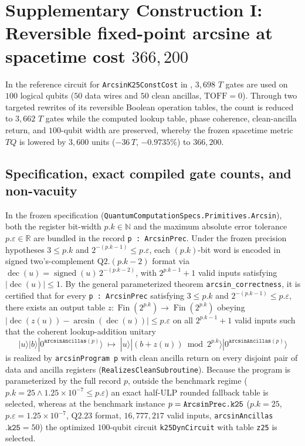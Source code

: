 \documentclass[11pt,a4paper]{article}
\theoremstyle{definition}
\theoremstyle{remark}
\begin{document}
\section{Supplementary Construction I: Reversible fixed-point arcsine at spacetime cost \texorpdfstring{\(366{,}200\)}{366,200}}
\label{sec:arcsin}

In the reference circuit for \texttt{ArcsinK25\allowbreak ConstCost} in \cite{shirobokov2026}, \(3{,}698\) \(T\) gates are used on \(100\) logical qubits (\(50\) data wires and \(50\) clean ancillas, \(\mathrm{TOFF} = 0\)). Through two targeted rewrites of its reversible Boolean operation tables, the count is reduced to \(3{,}662\) \(T\) gates while the computed lookup table, phase coherence, clean-ancilla return, and \(100\)-qubit width are preserved, whereby the frozen spacetime metric \(TQ\) is lowered by \(3{,}600\) units (\(-36\,T\), \(-0.9735\%\)) to \(366{,}200\).

\subsection{Specification, exact compiled gate counts, and non-vacuity}

In the frozen specification (\texttt{QuantumComputationSpecs.Primitives.Arcsin}), both the register bit-width \(p.k \in \mathbb{N}\) and the maximum absolute error tolerance \(p.\varepsilon \in \mathbb{R}\) are bundled in the record \texttt{p : ArcsinPrec}. Under the frozen precision hypotheses \(3 \le p.k\) and \(2^{-(p.k-1)} \le p.\varepsilon\), each \((p.k)\)-bit word is encoded in signed two's-complement \(\mathrm{Q}2.(p.k-2)\) format via \(\operatorname{dec}(u) = \operatorname{signed}(u)\,2^{-(p.k-2)}\), with \(2^{p.k-1}+1\) valid inputs satisfying \(|\operatorname{dec}(u)| \le 1\). By the general parameterized theorem \texttt{arcsin\_correctness}, it is certified that for every \texttt{p : ArcsinPrec} satisfying \(3 \le p.k\) and \(2^{-(p.k-1)} \le p.\varepsilon\), there exists an output table \(z : \operatorname{Fin}(2^{p.k}) \to \operatorname{Fin}(2^{p.k})\) obeying \(|\operatorname{dec}(z(u)) - \arcsin(\operatorname{dec}(u))| \le p.\varepsilon\) on all \(2^{p.k-1}+1\) valid inputs such that the coherent lookup-addition unitary
\[
  |u\rangle|b\rangle|0^{\texttt{arcsinAncillas}(p)}\rangle
  \;\longmapsto\;
  |u\rangle|(b + z(u)) \bmod 2^{p.k}\rangle|0^{\texttt{arcsinAncillas}(p)}\rangle
\]
is realized by \texttt{arcsinProgram p} with clean ancilla return on every disjoint pair of data and ancilla registers (\texttt{Realizes\allowbreak Clean\allowbreak Subroutine}). Because the program is parameterized by the full record \(p\), outside the benchmark regime (\(p.k = 25 \land 1.25 \times 10^{-7} \le p.\varepsilon\)) an exact half-ULP rounded fallback table is selected, whereas at the benchmark instance \(p = \texttt{Arcsin\allowbreak Prec.k25}\) (\(p.k = 25\), \(p.\varepsilon = 1.25 \times 10^{-7}\), \(\mathrm{Q}2.23\) format, \(16{,}777{,}217\) valid inputs, \texttt{arcsin\allowbreak Ancillas}~\(\texttt{.k25} = 50\)) the optimized \(100\)-qubit circuit \texttt{k25DynCircuit} with table \texttt{z25} is selected.
\end{document}

